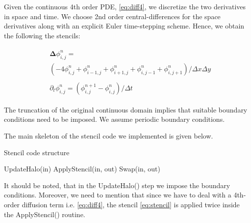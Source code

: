 
Given the continuous 4th order PDE, \cref{eq:diff4}, we discretize the two derivatives in space and time.
We choose 2nd order central-differences for the space derivatives along with an explicit Euler time-stepping scheme.
Hence, we obtain the following the stencils:

\begin{subequations}				
\label{eq:stencil}
\begin{align}
\begin{split}
&\boldsymbol\Delta \phi_{i, j}^{n}=\\
&\left(-4 \phi_{i, j}^{n}+\phi_{i-1, j}^{n}+\phi_{i+1, j}^{n}+\phi_{i, j-1}^{n}+\phi_{i, j+1}^{n}\right) / \Delta x \Delta y 
\end{split}
\\
\begin{split}
&\partial_{t} \phi_{i, j}^{n} =\left(\phi_{i, j}^{n+1}-\phi_{i, j}^{n}\right) / \Delta t
\end{split}
\end{align}
\end{subequations}

The truncation of the original continuous domain implies that suitable boundary conditions need to be imposed.
We assume periodic boundary conditions.

The main skeleton of the stencil code we implemented is given below.
\begin{algorithm}
\caption{Stencil code structure}
\begin{algorithmic}[1]
\State UpdateHalo(in) 
\State ApplyStencil(in, out) 
\State Swap(in, out)
\EndIf
\EndFor
\end{algorithmic}
\end{algorithm}

It should be noted, that in the UpdateHalo() step we impose the boundary conditions.
Moreover, we need to mention that since we have to deal with a 4th-order diffusion term i.e. \cref{eq:diff4}, the stencil \cref{eq:stencil} is applied twice inside the ApplyStencil() routine.

